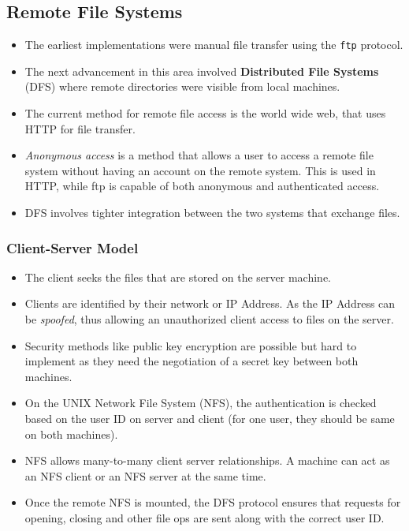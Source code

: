 \documentclass{article}
\theoremstyle{plain}
\theoremstyle{definition}
\begin{document}
\subsection{Remote File Systems}
\begin{itemize}
    \item The earliest implementations were manual file transfer using the \texttt{ftp} protocol. 
    
    \item The next advancement in this area involved \textbf{Distributed File Systems} (DFS) where remote directories were visible from local machines. 
    
    \item The current method for remote file access is the world wide web, that uses HTTP for file transfer.
    
    \item \textit{Anonymous access} is a method that allows a user to access a remote file system without having an account on the remote system. This is used in HTTP, while ftp is capable of both anonymous and authenticated access.
    
    \item DFS involves tighter integration between the two systems that exchange files. 
\end{itemize}

\subsubsection{Client-Server Model}
\begin{itemize}
    \item The client seeks the files that are stored on the server machine. 
    
    \item Clients are identified by their network or IP Address. As the IP Address can be \textit{spoofed}, thus allowing an unauthorized client access to files on the server. 
    
    \item Security methods like public key encryption are possible but hard to implement as they need the negotiation of a secret key between both machines. 
    
    \item On the UNIX Network File System (NFS), the authentication is checked based on the user ID on server and client (for one user, they should be same on both machines). 
    
    \item NFS allows many-to-many client server relationships. A machine can act as an NFS client or an NFS server at the same time. 
    
    \item Once the remote NFS is mounted, the DFS protocol ensures that requests for opening, closing and other file ops are sent along with the correct user ID. 
\end{itemize}
\end{document}
